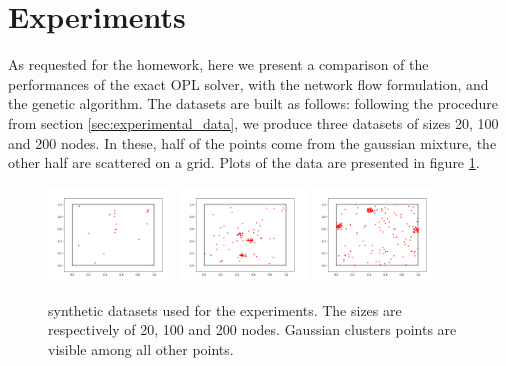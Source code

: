 \documentclass{article}
\begin{document}
\section{Experiments}\label{sec:experiments}
As requested for the homework, here we present a comparison of the performances of the exact OPL solver, with the network flow formulation, and the genetic algorithm. The datasets are built as follows: following the procedure from section \ref{sec:experimental_data}, we produce three datasets of sizes 20, 100 and 200 nodes. In these, half of the points come from the gaussian mixture, the other half are scattered on a grid. Plots of the data are presented in figure \ref{fig:datasets}.

\begin{figure}
    \centering
    \includegraphics[width=0.3\textwidth]{pics/experimental_data_20.png}
   \includegraphics[width=0.3\textwidth]{pics/experimental_data_100.png} 
   \includegraphics[width=0.3\textwidth]{pics/experimental_data_200.png}
    \caption{synthetic datasets used for the experiments. The sizes are respectively of 20, 100 and 200 nodes. Gaussian clusters points are visible among all other points.}
    \label{fig:datasets}
\end{figure}
\end{document}

